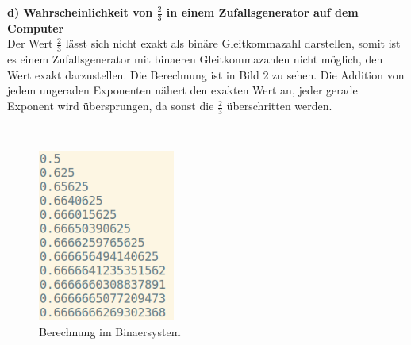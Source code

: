 \documentclass{article}
\begin{document}
\textbf{d) Wahrscheinlichkeit von $\frac{2}{3}$ in einem Zufallsgenerator auf dem Computer} \\

Der Wert $\frac{2}{3}$ l\"asst sich nicht exakt als bin\"are Gleitkommazahl darstellen,
somit ist es einem Zufallsgenerator mit binaeren Gleitkommazahlen nicht m\"oglich,
den Wert exakt darzustellen. Die Berechnung ist in Bild 2 zu sehen. 
Die Addition von jedem ungeraden Exponenten n\"ahert den exakten Wert an, 
jeder gerade Exponent wird \"ubersprungen, da sonst die $\frac{2}{3}$  \"uberschritten werden.

\\

\begin{figure}[htbp]
	\centering
	\includegraphics[width=0.4\textwidth]{Binaer2zu3.png}
	\caption{Berechnung im Binaersystem}
\end{figure}
\end{document}
